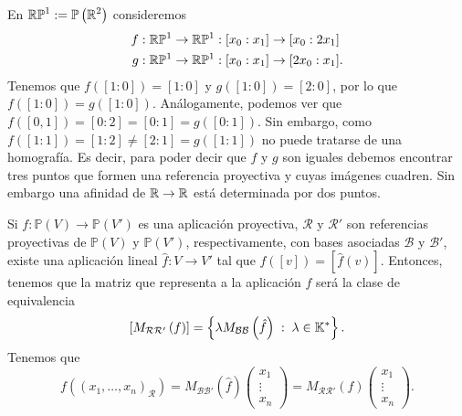 \begin{eg}
En $\displaystyle \mathbb{R}\mathbb{P}^{1} := \mathbb{P}\left(\mathbb{R}^{2}\right) $ consideremos 
\[
\begin{split}
	f : \mathbb{R}\mathbb{P}^{1} & \to \mathbb{R}\mathbb{P}^{1} : [x_{0}:x_{1}]  \to [x_{0}:2x_{1}] \\
	g : \mathbb{R}\mathbb{P}^{1} & \to \mathbb{R}\mathbb{P}^{1} : [x_{0}:x_{1}] \to [2x_{0}:x_{1}].
\end{split}
\]
Tenemos que $\displaystyle f\left([1:0]\right)=[1:0] $ y $\displaystyle g\left([1:0]\right)= [2:0] $, por lo que $\displaystyle  f\left([1:0]\right) =  g\left([1:0]\right) $. Análogamente, podemos ver que $\displaystyle f\left([0,1]\right)=[0:2] = [0:1] = g\left([0:1]\right) $. Sin embargo, como $\displaystyle f\left([1:1]\right) = [1:2] \neq [2:1] = g\left([1:1]\right)$ no puede tratarse de una homografía. Es decir, para poder decir que $\displaystyle f $ y $\displaystyle g $ son iguales debemos encontrar tres puntos que formen una referencia proyectiva y cuyas imágenes cuadren. Sin embargo una afinidad de $\displaystyle \mathbb{R} \to \mathbb{R} $ está determinada por dos puntos. 
\end{eg}
\begin{observation}
	Si $\displaystyle f : \mathbb{P}\left(V\right) \to \mathbb{P}\left(V'\right) $ es una aplicación proyectiva, $\displaystyle \mathcal{R} $ y $\displaystyle \mathcal{R}' $ son referencias proyectivas de $\displaystyle \mathbb{P}\left(V\right) $ y $\displaystyle \mathbb{P}\left(V'\right) $, respectivamente, con bases asociadas $\displaystyle \mathcal{B} $ y $\displaystyle \mathcal{B}' $, existe una aplicación lineal $\displaystyle \hat{f} : V \to V' $ tal que $\displaystyle f\left([v]\right) = [\hat{f}\left(v\right)] $.
	Entonces, tenemos que la matriz que representa a la aplicación $\displaystyle f  $ será la clase de equivalencia
	\[ \left[M_{\mathcal{R}\mathcal{R}'}\left(f\right)\right] = \left\{ \lambda M_{\mathcal{B}\mathcal{B}}\left(\hat{f}\right) \; :\; \lambda \in \mathbb{K}^{*}\right\}  .\]
	Tenemos que 
	\[f\left(\left(x_{1}, \ldots, x_{n}\right)_{\mathcal{R}}\right) = M_{\mathcal{B}\mathcal{B}'}\left(\hat{f}\right)\begin{pmatrix} x_{1} \\ \vdots \\ x_{n} \end{pmatrix} = M_{\mathcal{R}\mathcal{R}'}\left(f\right)\begin{pmatrix} x_{1} \\ \vdots \\ x_{n} \end{pmatrix} .\]
\end{observation}

